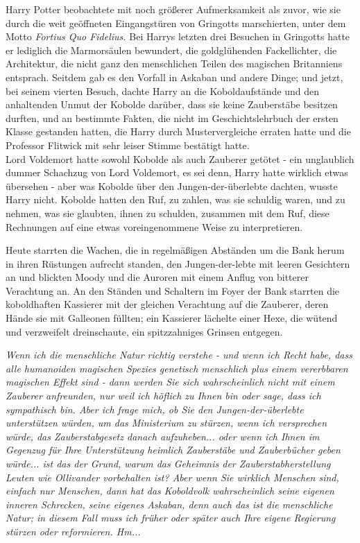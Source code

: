 {Harry Potter beobachtete mit noch größerer Aufmerksamkeit als zuvor, wie sie durch die weit geöffneten Eingangstüren von Gringotts marschierten, unter dem Motto \emph{Fortius Quo Fidelius.} Bei Harrys letzten drei Besuchen in Gringotts hatte er lediglich die Marmorsäulen bewundert, die goldglühenden Fackellichter, die Architektur, die nicht ganz den menschlichen Teilen des magischen Britanniens entsprach. Seitdem gab es den Vorfall in Askaban und andere Dinge; und jetzt, bei seinem vierten Besuch, dachte Harry an die Koboldaufstände und den anhaltenden Unmut der Kobolde darüber, dass sie keine Zauberstäbe besitzen durften, und an bestimmte Fakten, die nicht im Geschichtslehrbuch der ersten Klasse gestanden hatten, die Harry durch Mustervergleiche erraten hatte und die Professor Flitwick mit sehr leiser Stimme bestätigt hatte.\\ Lord Voldemort hatte sowohl Kobolde als auch Zauberer getötet - ein unglaublich dummer Schachzug von Lord Voldemort, es sei denn, Harry hatte wirklich etwas übersehen - aber was Kobolde über den Jungen-der-überlebte dachten, wusste Harry nicht. Kobolde hatten den Ruf, zu zahlen, was sie schuldig waren, und zu nehmen, was sie glaubten, ihnen zu schulden, zusammen mit dem Ruf, diese Rechnungen auf eine etwas voreingenommene Weise zu interpretieren.

Heute starrten die Wachen, die in regelmäßigen Abständen um die Bank herum in ihren Rüstungen aufrecht standen, den Jungen-der-lebte mit leeren Gesichtern an und blickten Moody und die Auroren mit einem Anflug von bitterer Verachtung an. An den Ständen und Schaltern im Foyer der Bank starrten die koboldhaften Kassierer mit der gleichen Verachtung auf die Zauberer, deren Hände sie mit Galleonen füllten; ein Kassierer lächelte einer Hexe, die wütend und verzweifelt dreinschaute, ein spitzzahniges Grinsen entgegen.

\emph{Wenn ich die menschliche Natur richtig verstehe - und wenn ich Recht habe, dass alle humanoiden magischen Spezies genetisch menschlich plus einem vererbbaren magischen Effekt sind - dann werden Sie sich wahrscheinlich nicht mit einem Zauberer anfreunden, nur weil ich höflich zu Ihnen bin oder sage, dass ich sympathisch bin. Aber ich frage mich, ob Sie den Jungen-der-überlebte unterstützen würden, um das Ministerium zu stürzen, wenn ich versprechen würde, das Zauberstabgesetz danach aufzuheben... oder wenn ich Ihnen im Gegenzug für Ihre Unterstützung heimlich Zauberstäbe und Zauberbücher geben würde... ist das der Grund, warum das Geheimnis der Zauberstabherstellung Leuten wie Ollivander vorbehalten ist? Aber wenn Sie wirklich Menschen sind, einfach nur Menschen, dann hat das Koboldvolk wahrscheinlich seine eigenen inneren Schrecken, seine eigenes Askaban, denn auch das ist die menschliche Natur; in diesem Fall muss ich früher oder später auch Ihre eigene Regierung stürzen oder reformieren. Hm...}

}
